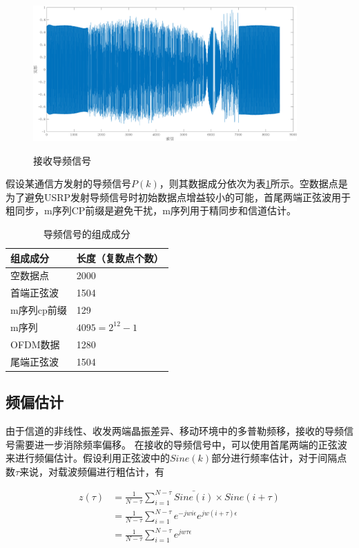 \begin{figure}[htbp]
    \centering
    \includegraphics[width=0.9\textwidth]{images/rx_pilot}
    \caption{接收导频信号}{} 
    \label{rx_pilot}
\end{figure}

假设某通信方发射的导频信号$P(k)$，则其数据成分依次为表\ref{component_of_pilot}所示。空数据点是为了避免USRP发射导频信号时初始数据点增益较小的可能，首尾两端正弦波用于粗同步，m序列CP前缀是避免干扰，m序列用于精同步和信道估计。

\begin{table}[]
    \centering
    \begin{tabular}{|l|l|}
    \hline
    组成成分 & 长度（复数点个数）\\ \hline
    空数据点 & 2000 \\ \hline
    首端正弦波 & 1504 \\ \hline
    m序列cp前缀 & 129 \\ \hline
    m序列 & $ 4095 = 2^{12} - 1 $ \\ \hline
    OFDM数据 & 1280 \\ \hline
    尾端正弦波 & 1504 \\ \hline
    \end{tabular}
    \caption{导频信号的组成成分
    \label{component_of_pilot}}
\end{table}

\subsection{频偏估计}

由于信道的非线性、收发两端晶振差异、移动环境中的多普勒频移，接收的导频信号需要进一步消除频率偏移。
在接收的导频信号中，可以使用首尾两端的正弦波来进行频偏估计。假设利用正弦波中的$Sine(k)$部分进行频率估计，对于间隔点数$\tau$来说，对载波频偏进行粗估计，有

\begin{align}
    z(\tau) & = \frac{1}{N - \tau} \sum_{i = 1}^{N-\tau} \bar{Sine(i)} \times Sine(i + \tau) \\
    & = \frac{1}{N-\tau} \sum_{i = 1}^{N-\tau} e^{-jwi\epsilon} e^{jw(i+\tau)\epsilon} \\
    & = \frac{1}{N-\tau} \sum_{i = 1}^{N-\tau} e^{jw\tau\epsilon}
\end{align}

